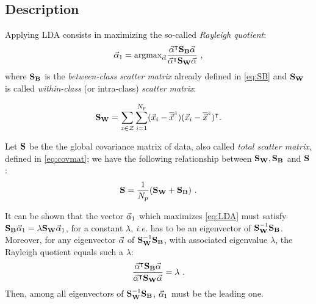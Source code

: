 \subsection{Description} Applying LDA consists in maximizing the so-called {\em Rayleigh quotient}:
 \begin{equation}\label{eq:LDA}
 \vec{\alpha}_1=\mathrm{argmax}_{\vec{\alpha}} \frac{\vec{\alpha}^\intercal \textbf{S}_{\textbf{B}} \vec{\alpha}}{\vec{\alpha}^\intercal \textbf{S}_{\textbf{W}} \vec{\alpha}} \mbox{ ,}
 \end{equation}
where $\textbf{S}_{\textbf{B}}$ is the {\em between-class scatter matrix} already defined in \eqref{eq:SB} and $\textbf{S}_{\textbf{W}}$ is called 
{\em within-class} (or intra-class) {\em scatter matrix}:

\begin{equation}
\textbf{S}_{\textbf{W}} = \sum_{z\in\mathcal{Z}}\sum_{i=1}^{N_p}(\vec{x}_i-\overline{\vec{x}}^{z})(\vec{x}_i-\overline{\vec{x}}^{z})^\intercal \mbox{.}
\end{equation}


\begin{remark}
Let $\textbf{S}$ be the the global covariance matrix of data, also called {\em total scatter matrix}, defined in \eqref{eq:covmat}; we have the following relationship between $\textbf{S}_{\textbf{W}},\textbf{S}_{\textbf{B}}$ and $\textbf{S}$:
\begin{equation}
\textbf{S} = \frac{1}{N_p}(\textbf{S}_{\textbf{W}} + \textbf{S}_{\textbf{B}}) \mbox{ .}
\end{equation}
\end{remark}

It can be shown that the vector $\vec{\alpha}_1$ which maximizes \eqref{eq:LDA} must satisfy $\textbf{S}_{\textbf{B}}\vec{\alpha}_1 = \lambda \textbf{S}_{\textbf{W}} \vec{\alpha}_1$, for a constant $\lambda$, \textit{i.e.} has to be an eigenvector of $\textbf{S}_{\textbf{W}}^{-1} \textbf{S}_{\textbf{B}}$. Moreover, for any eigenvector $\vec{\alpha}$ of $\textbf{S}_{\textbf{W}}^{-1}\textbf{S}_{\textbf{B}}$, with associated eigenvalue $\lambda$, the Rayleigh quotient equals such a $\lambda$:
\begin{equation}\label{eq:lambdas}
\frac{\vec{\alpha}^\intercal \textbf{S}_{\textbf{B}} \vec{\alpha}}{\vec{\alpha}^\intercal \textbf{S}_{\textbf{W}} \vec{\alpha}} = \lambda \mbox{ .}
\end{equation}
Then, among all eigenvectors of $\textbf{S}_{\textbf{W}}^{-1} \textbf{S}_{\textbf{B}}$, $\vec{\alpha}_1$ must be the leading one. \\

